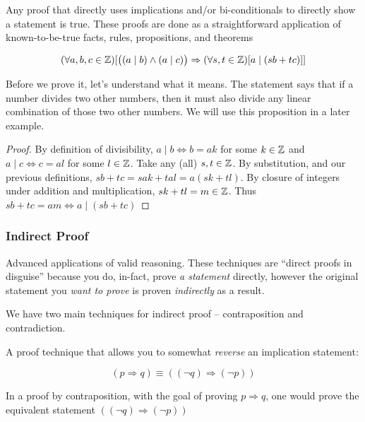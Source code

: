 \documentclass[main.tex]{subfiles}
\begin{document}
\begin{defn}
	
\end{defn}

\begin{defn}
	Any proof that directly uses implications and/or bi-conditionals to directly show a statement is true. These proofs are done as a straightforward application of known-to-be-true facts, rules, propositions, and theorems
\end{defn}

\begin{prop}\label{prop:3.x-lin-combo-div}
	\[(\forall a,b,c \in \mathbb{Z})[\big((a \mid b) \land (a \mid c)\big) \Rightarrow (\forall s,t \in \mathbb{Z})[a \mid (sb + tc)]]\]
\end{prop}

Before we prove it, let's understand what it means. The statement says that if a number divides two other numbers, then it must also divide any linear combination of those two other numbers. We will use this proposition in a later example.

\begin{proof}
	By definition of divisibility, \(a \mid b \Leftrightarrow b = ak\) for some \(k \in \mathbb{Z}\) and \(a \mid c \Leftrightarrow c = al\) for some \(l \in \mathbb{Z}\). Take any (all) \(s,t \in \mathbb{Z}\). By substitution, and our previous definitions, \(sb + tc = sak + tal = a(sk + tl)\). By closure of integers under addition and multiplication, \(sk + tl = m \in \mathbb{Z}\). Thus \(sb + tc = am \Leftrightarrow a \mid (sb + tc)\)
\end{proof}

\begin{prop}
	
\end{prop}

\subsubsection{Indirect Proof}

Advanced applications of valid reasoning. These techniques are ``direct proofs in disguise'' because you do, in-fact, prove \textit{a statement} directly, however the original statement you \textit{want to prove} is proven \textit{indirectly} as a result.

We have two main techniques for indirect proof -- contraposition and contradiction.

\begin{defn}
	A proof technique that allows you to somewhat \textit{reverse} an implication statement:
	
	\[(p \Rightarrow q) \equiv ((\lnot q) \Rightarrow (\lnot p))\]
	
	In a proof by contraposition, with the goal of proving \(p \Rightarrow q\), one would prove the equivalent statement \(((\lnot q) \Rightarrow (\lnot p))\)
\end{defn}
\end{document}
